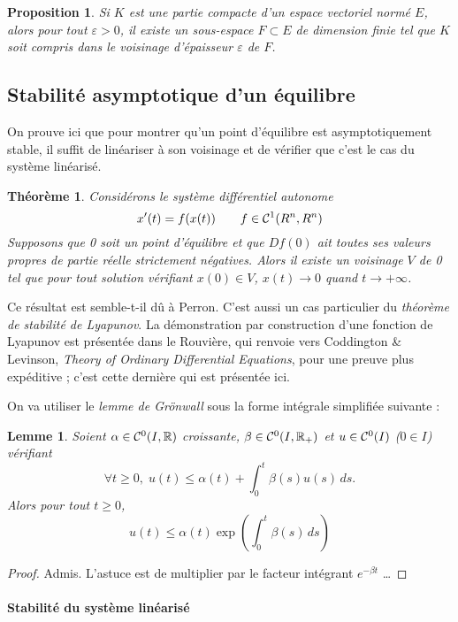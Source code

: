 \documentclass[a4paper, 11pt]{article}
\def\R{\mathbb{R}}
\def\Cf{{\cal{C}}}
\newtheorem*{proposition}{Proposition}
\newtheorem*{theorem}{Théorème}
\newtheorem*{lemma}{Lemme}
\begin{document}
\begin{proposition}
  Si $K$ est une partie compacte d'un espace vectoriel normé $E$, alors pour
  tout $\varepsilon > 0$, il existe un sous-espace $F \subset E$ de dimension
  finie tel que $K$ soit compris dans le voisinage d'épaisseur $\varepsilon$ de
  $F$.
\end{proposition}

\newpage

\subsection{Stabilité asymptotique d'un équilibre}
\label{stable}

On prouve ici que pour montrer qu'un point d'équilibre est asymptotiquement
stable, il suffit de linéariser à son voisinage et de vérifier que c'est le cas
du système linéarisé.

\begin{theorem}
  Considérons le système différentiel autonome
  \[ x'(t) = f(x(t)) \qquad f \in \Cf^1(R^n, R^n)  \]
  Supposons que 0 soit un point d'équilibre et que $Df(0)$ ait toutes ses
  valeurs propres de partie réelle strictement négatives. Alors il existe un
  voisinage $V$ de 0 tel que pour tout solution vérifiant $x(0) \in V$, $x(t)
  \to 0$ quand $t \to +\infty$.
\end{theorem}

Ce résultat est semble-t-il dû à Perron. C'est aussi un cas particulier du
\emph{théorème de stabilité de Lyapunov}. La démonstration par construction
d'une fonction de Lyapunov est présentée dans le Rouvière, qui renvoie vers
Coddington \& Levinson, \emph{Theory of Ordinary Differential Equations}, pour
une preuve plus expéditive ; c'est cette dernière qui est présentée ici.

On va utiliser le \emph{lemme de Grönwall} sous la forme intégrale simplifiée
suivante :
\begin{lemma}
  Soient $\alpha \in \Cf^0(I, \R)$ croissante, $\beta \in \Cf^0(I, \R_+)$ et $u
  \in \Cf^0(I)$ ($0 \in I$) vérifiant
  \[ \forall t \geq 0,\; u(t) \leq \alpha(t) + \int_0^t \beta(s)u(s)\,ds.  \]
  Alors pour tout $t \geq 0$,
  \[ u(t) \leq \alpha(t) \exp\left(\int_0^t \beta(s)\,ds\right) \]
\end{lemma}
\begin{proof}
  Admis. L'astuce est de multiplier par le facteur intégrant $e^{-\beta t}$ …
\end{proof}

\paragraph{Stabilité du système linéarisé}
\end{document}
